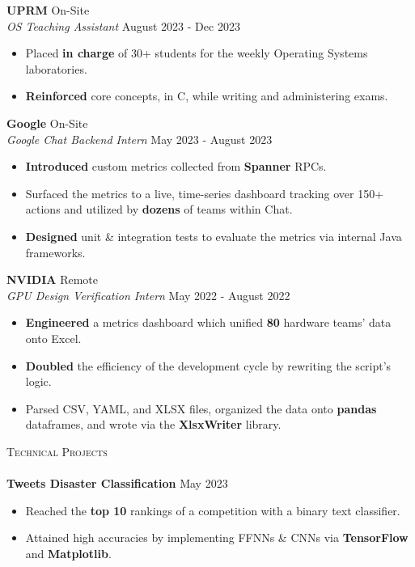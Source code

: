 \documentclass[a4paper]{article}
\newcommand{\lineunder} {
    \vspace*{-8pt} \\
    \hspace*{-18pt} \hrulefill \\
}
\newcommand{\header} [1] {
    {\hspace*{-18pt}\vspace*{6pt} \textsc{#1}}
    \vspace*{-6pt} \lineunder
}
\begin{document}
\textbf{UPRM} \hfill On-Site\\
\textit{OS Teaching Assistant} \hfill August 2023 - Dec 2023 \\
\vspace{-2mm}
\begin{itemize} \itemsep -1pt
	\item Placed \textbf{in charge} of 30+ students for the weekly Operating Systems laboratories.
	\item \textbf{Reinforced} core concepts, in C, while writing and administering exams.
\end{itemize}
\vspace{-2mm}

\textbf{Google} \hfill On-Site\\
\textit{Google Chat Backend Intern} \hfill May 2023 - August 2023\\
\vspace{-2mm}
\begin{itemize} \itemsep -1pt
	\item \textbf{Introduced} custom metrics collected from \textbf{Spanner} RPCs.
	\item Surfaced the metrics to a live, time-series dashboard tracking over 150+ actions and utilized by \textbf{dozens} of teams within Chat.
	\item \textbf{Designed} unit \& integration tests to evaluate the metrics via internal Java frameworks.
\end{itemize}
\vspace{-2mm}

\textbf{NVIDIA} \hfill Remote\\
\textit{GPU Design Verification Intern} \hfill May 2022 - August 2022\\
\vspace{-2mm}
\begin{itemize} \itemsep -1pt
	\item \textbf{Engineered} a metrics dashboard which unified \textbf{80} hardware teams' data onto Excel.
	\item \textbf{Doubled} the efficiency of the development cycle by rewriting the script's logic. 
	\item Parsed CSV, YAML, and XLSX files, organized the data onto \textbf{pandas} dataframes, and wrote via the \textbf{XlsxWriter} library. 
\end{itemize}
\vspace{-2mm}


\header{Technical Projects}
{\textbf{Tweets Disaster Classification}} \hfill May 2023 \\
\vspace{-2mm}
\begin{itemize} \itemsep -1pt
\item Reached the \textbf{top 10} rankings of a competition with a binary text classifier. 

\item Attained high accuracies by implementing FFNNs \& CNNs via \textbf{TensorFlow} and \textbf{Matplotlib}.
\end{itemize}
\vspace{-1mm}
\end{document}
